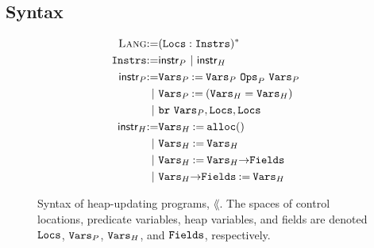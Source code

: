 \subsection{Syntax}
\label{sec:syntax}
\begin{figure}
  \centering
  \begin{align}
    \textsc{Lang} \mathbin{:=} & (\mathtt{Locs}: \mathtt{Instrs})^{*} \label{line:prog} \\
    \mathtt{Instrs} \mathbin{:=} & \mathsf{instr}_P\ |\ \mathsf{instr}_H \label{line:instrs} \\
    \mathsf{instr}_P \mathbin{:=} &
    \mathtt{Vars}_P \mathbin{:=} \mathtt{Vars}_P\ \mathtt{Ops}_P\ \mathtt{Vars}_P
    \label{line:bool-op} \\
    |\ & \mathtt{Vars}_P \mathbin{:=} (\mathtt{Vars}_H = \mathtt{Vars}_H)
    \label{line:test-eq} \\
    |\ & \mathtt{br}\ \mathtt{Vars}_P, \mathtt{Locs}, \mathtt{Locs} \label{line:branch} \\
    \mathsf{instr}_H \mathbin{:=} & \mathtt{Vars}_H \mathbin{:=} \mathtt{alloc}()
    \label{line:alloc} \\
    |\ & \mathtt{Vars}_H \mathbin{:=} \mathtt{Vars}_H \label{line:copy} \\
    |\ & \mathtt{Vars}_H \mathbin{:=} \mathtt{Vars}_H \mathtt{->} \mathtt{Fields}
    \label{line:load} \\
    |\ & \mathtt{Vars}_H \mathtt{->} \mathtt{Fields} \mathbin{:=} \mathtt{Vars}_H
    \label{line:store}
  \end{align}
  \caption{Syntax of heap-updating programs, $\lang$.
    The spaces of control locations, predicate variables, heap
    variables, and fields are denoted $\mathtt{Locs}$, $\mathtt{Vars}_P$,
    $\mathtt{Vars}_H$, and $\mathtt{Fields}$, respectively.
  }
  \label{fig:syntax}
\end{figure}

